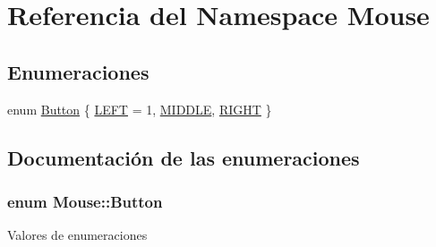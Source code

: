 \hypertarget{namespace_mouse}{}\section{Referencia del Namespace Mouse}
\label{namespace_mouse}
\subsection*{Enumeraciones}
\begin{DoxyCompactItemize}
\item 
enum \hyperlink{namespace_mouse_a2189c95ac90001266b97105c25085270}{Button} \{ \hyperlink{namespace_mouse_a2189c95ac90001266b97105c25085270ad7d7b1c6fe170b33cf318f4c80fcb56c}{L\+E\+F\+T} = 1, 
\hyperlink{namespace_mouse_a2189c95ac90001266b97105c25085270a679f0f82628c3437ff9948cbb88c71c3}{M\+I\+D\+D\+L\+E}, 
\hyperlink{namespace_mouse_a2189c95ac90001266b97105c25085270a969d1e48dd080d49a088aef10bdc83e3}{R\+I\+G\+H\+T}
 \}
\end{DoxyCompactItemize}


\subsection{Documentación de las enumeraciones}
\hypertarget{namespace_mouse_a2189c95ac90001266b97105c25085270}{}
\subsubsection[{Button}]{\setlength{\rightskip}{0pt plus 5cm}enum {\bf Mouse\+::\+Button}}\label{namespace_mouse_a2189c95ac90001266b97105c25085270}
\begin{Desc}
\item[Valores de enumeraciones]\par
\begin{description}
\item[{\em 
\hypertarget{namespace_mouse_a2189c95ac90001266b97105c25085270ad7d7b1c6fe170b33cf318f4c80fcb56c}{}L\+E\+F\+T\label{namespace_mouse_a2189c95ac90001266b97105c25085270ad7d7b1c6fe170b33cf318f4c80fcb56c}
}]\item[{\em 
\hypertarget{namespace_mouse_a2189c95ac90001266b97105c25085270a679f0f82628c3437ff9948cbb88c71c3}{}M\+I\+D\+D\+L\+E\label{namespace_mouse_a2189c95ac90001266b97105c25085270a679f0f82628c3437ff9948cbb88c71c3}
}]\item[{\em 
\hypertarget{namespace_mouse_a2189c95ac90001266b97105c25085270a969d1e48dd080d49a088aef10bdc83e3}{}R\+I\+G\+H\+T\label{namespace_mouse_a2189c95ac90001266b97105c25085270a969d1e48dd080d49a088aef10bdc83e3}
}]\end{description}
\end{Desc}
